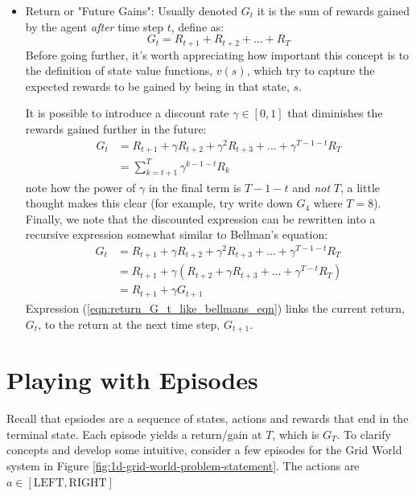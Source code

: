 \documentclass[a4paper,11pt]{article}
\begin{document}
\begin{itemize}
    \item Return or "Future Gains":  Usually denoted $G_t$ it is the sum of rewards gained by the agent {\it after} time step $t$, define as:
    \begin{equation} \label{eqn:return_G_t}
        G_t = R_{t+1} + R_{t+2} + ... + R_{T}
    \end{equation}
    Before going further, it's worth appreciating how important this concept is to the definition of state value functions, $v(s)$, which try to capture the expected rewards to be gained by being in that state, $s$.

    It is possible to introduce a discount rate $\gamma \in [0,1]$ that diminishes the rewards gained further in the future:
    \begin{equation} \label{eqn:return_G_t_discounted}
    \begin{split}
        G_t &= R_{t+1} + \gamma R_{t+2} + \gamma^2 R_{t+3} + ... + \gamma^{T-1-t} R_{T} \\
        &= \sum_{k=t+1}^{T} \gamma^{k-1-t}R_k
    \end{split}
    \end{equation}
    note how the power of $\gamma$ in the final term is $T-1-t$ and {\it not} $T$, a little thought makes this clear (for example, try write down $G_4$ where $T=8$).  Finally, we note that the discounted expression can be rewritten into a recursive expression somewhat similar to Bellman's equation:
    \begin{equation} \label{eqn:return_G_t_like_bellmans_eqn}
    \begin{split}
        G_t &= R_{t+1} + \gamma R_{t+2} + \gamma^2 R_{t+3} + ... + \gamma^{T-1-t} R_{T} \\
        &= R_{t+1} + \gamma( R_{t+2} + \gamma R_{t+3} + ... + \gamma^{T-t} R_{T}) \\
        &= R_{t+1} + \gamma G_{t+1}
    \end{split}
    \end{equation}
    Expression (\ref{eqn:return_G_t_like_bellmans_eqn}) links the current return, $G_t$, to the return at the next time step, $G_{t+1}$.
\end{itemize}

\section{Playing with Episodes}

Recall that epsiodes are a sequence of states, actions and rewards that end in the terminal state.  Each episode yields a return/gain at $T$, which is $G_T$.  To clarify concepts and develop some intuitive, consider a few episodes for the Grid World system in Figure \ref{fig:1d-grid-world-problem-statement}.  The actions are $a \in [\text{LEFT}, \text{RIGHT}]$
\end{document}

